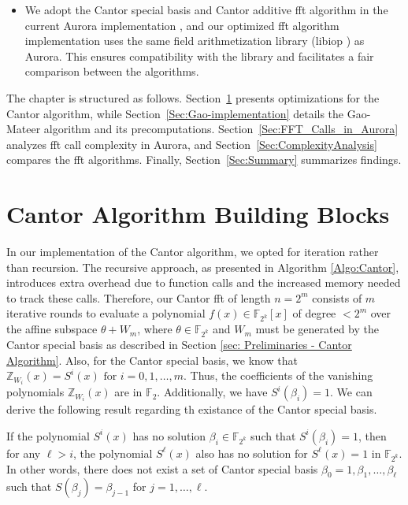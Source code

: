 \begin{itemize}
	
	\item  We adopt the Cantor special basis and Cantor additive \gls{fft} algorithm in the current Aurora implementation \cite{libiop}, and our optimized \gls{fft} algorithm implementation uses the same field arithmetization library (libiop \cite{libiop}) as Aurora. This ensures compatibility with the library and facilitates a fair comparison between the algorithms.
\end{itemize}



 The chapter is structured as follows.  Section~\ref{Sec:Cantor Implementation} presents optimizations for the Cantor algorithm, while Section~\ref{Sec:Gao-implementation} details the Gao-Mateer algorithm and its precomputations. Section~\ref{Sec:FFT_Calls_in_Aurora} analyzes \gls{fft} call complexity in Aurora, and Section~\ref{Sec:ComplexityAnalysis} compares the \gls{fft} algorithms. Finally, Section~\ref{Sec:Summary} summarizes findings.


\section{Cantor Algorithm Building Blocks}\label{Sec:Cantor Implementation}

In our implementation of the Cantor algorithm, we opted for iteration rather than recursion. The recursive approach, as presented in Algorithm \ref{Algo:Cantor}, introduces extra overhead due to function calls and the increased memory needed to track these calls. Therefore, our Cantor \gls{fft} of length $n = 2^m$ consists of $m$ iterative rounds to evaluate a polynomial $f(x)\in\mathbb{F}_{2^k}[x]$ of degree $<2^m$ over the affine subspace $\theta + W_m$, where $\theta \in \mathbb{F}_{2^k}$ and $W_m$ must be generated by the Cantor special basis as described in Section \ref{sec: Preliminaries - Cantor Algorithm}. Also, for the Cantor special basis, we know that $\mathbb{Z}_{W_{i}}(x)=S^{i}(x) \text{ for } i=0,1,\ldots,m$. Thus, the coefficients of the vanishing polynomials $\mathbb{Z}_{W_{i}}(x)$ are in $\mathbb{F}_2$. Additionally, we have $S^{i}(\beta_{i}) = 1$. We can derive the following result regarding th existance of the Cantor special basis.

\begin{theorem}
	If the polynomial $S^{i}(x)$ has no solution $\beta_{i} \in \mathbb{F}_{2^k}$ such that $S^i(\beta_i) = 1$, then for any $\ell > i$, the polynomial $S^{\ell}(x)$ also has no solution for $S^{\ell}(x) = 1$ in $\mathbb{F}_{2^k}$. In other words, there does not exist a set of Cantor special basis ${\beta_0=1, \beta_1, \ldots, \beta_{\ell}}$ such that $S(\beta_j) = \beta_{j-1}$ for $j=1,\ldots,\ell$.
 \end{theorem}


